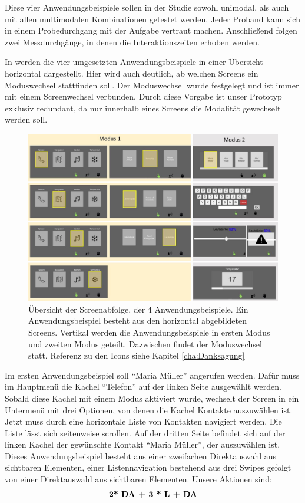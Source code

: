 Diese vier Anwendungsbeispiele sollen in der Studie sowohl unimodal, als auch mit allen multimodalen Kombinationen getestet werden. 
Jeder Proband kann sich in einem Probedurchgang mit der Aufgabe vertraut machen.
Anschließend folgen zwei Messdurchgänge, in denen die Interaktionszeiten erhoben werden. 

In  werden die vier umgesetzten Anwendungsbeispiele in einer Übersicht horizontal dargestellt. 
Hier wird auch deutlich, ab welchen Screens ein Moduswechsel stattfinden soll. 
Der Moduswechsel wurde festgelegt und ist immer mit einem Screenwechsel verbunden. 
Durch diese Vorgabe ist unser Prototyp exklusiv redundant, da nur innerhalb eines Screens die Modalität gewechselt werden soll. 
\begin{figure}[ht]
  \centering
  \includegraphics[width=1\textwidth]{img/UseCases2.jpg}
  \caption[Übersicht der Screenabfolge, der 4 Anwendungsbeispiele.]{Übersicht der Screenabfolge, der 4 Anwendungsbeispiele. Ein Anwendungsbeispiel besteht aus den horizontal abgebildeten Screens. Vertikal werden die Anwendungsbeispiele in ersten Modus und zweiten Modus geteilt. Dazwischen findet der Moduswechsel statt. Referenz zu den Icons siehe Kapitel \ref{cha:Danksagung}}
  \label{fig:UseCases}
\end{figure}

Im ersten Anwendungsbeispiel soll "`Maria Müller"' angerufen werden. Dafür muss im Hauptmenü die Kachel "`Telefon"' auf der linken Seite ausgewählt werden. 
Sobald diese Kachel mit einem Modus aktiviert wurde, wechselt der Screen in ein Untermenü mit drei Optionen, von denen die Kachel Kontakte auszuwählen ist. 
Jetzt muss durch eine horizontale Liste von Kontakten navigiert werden. 
Die Liste lässt sich seitenweise scrollen. 
Auf der dritten Seite befindet sich auf der linken Kachel der gewünschte Kontakt "`Maria Müller"', der auszuwählen ist. 
Dieses Anwendungsbeispiel besteht aus einer zweifachen Direktauswahl aus sichtbaren Elementen, einer Listennavigation bestehend aus drei Swipes gefolgt von einer Direktauswahl aus sichtbaren Elementen. 
Unsere Aktionen sind:
$$\textbf{2* \text{DA} + 3 * \text{L} + \text{DA}}$$

